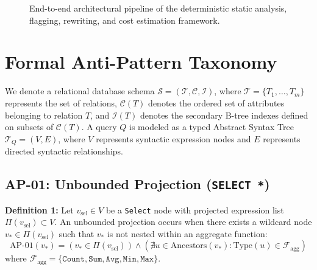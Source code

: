 \documentclass[conference]{IEEEtran}
\begin{document}
\begin{figure}[t]
\centering
{}
\caption{End-to-end architectural pipeline of the deterministic static analysis, flagging, rewriting, and cost estimation framework.}
\label{fig:architecture}
\end{figure}

\section{Formal Anti-Pattern Taxonomy}

We denote a relational database schema $\mathcal{S} = (\mathcal{T}, \mathcal{C}, \mathcal{I})$, where $\mathcal{T} = \{T_1, \dots, T_m\}$ represents the set of relations, $\mathcal{C}(T)$ denotes the ordered set of attributes belonging to relation $T$, and $\mathcal{I}(T)$ denotes the secondary B-tree indexes defined on subsets of $\mathcal{C}(T)$. A query $Q$ is modeled as a typed Abstract Syntax Tree $\mathcal{T}_Q = (V, E)$, where $V$ represents syntactic expression nodes and $E$ represents directed syntactic relationships.

\subsection{AP-01: Unbounded Projection (\texttt{SELECT *})}
\textbf{Definition 1:} Let $v_{\text{sel}} \in V$ be a \texttt{Select} node with projected expression list $\Pi(v_{\text{sel}}) \subset V$. An unbounded projection occurs when there exists a wildcard node $v_* \in \Pi(v_{\text{sel}})$ such that $v_*$ is not nested within an aggregate function:
\begin{equation}
    \text{AP-01}(v_*) = (v_* \in \Pi(v_{\text{sel}})) \land (\nexists u \in \text{Ancestors}(v_*) : \text{Type}(u) \in \mathcal{F}_{\text{agg}})
\end{equation}
where $\mathcal{F}_{\text{agg}} = \{\texttt{Count}, \texttt{Sum}, \texttt{Avg}, \texttt{Min}, \texttt{Max}\}$.
\end{document}
